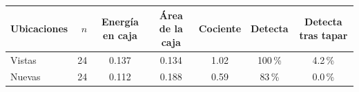 \begin{tabular}{lrccccc}
\hline
Ubicaciones & $n$ & Energ\'ia en caja & \'Area de la caja & Cociente & Detecta & Detecta tras tapar \\
\hline
Vistas & 24 & 0.137 & 0.134 & 1.02 & 100\,\% & 4.2\,\% \\
Nuevas & 24 & 0.112 & 0.188 & 0.59 & 83\,\% & 0.0\,\% \\
\hline
\end{tabular}
